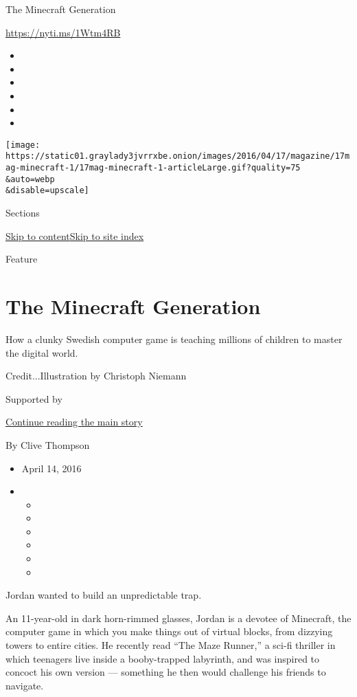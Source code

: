 The Minecraft Generation

\url{https://nyti.ms/1Wtm4RB}

\begin{itemize}
\item
\item
\item
\item
\item
\item
\end{itemize}

\texttt{[image: https://static01.graylady3jvrrxbe.onion/images/2016/04/17/magazine/17mag-minecraft-1/17mag-minecraft-1-articleLarge.gif?quality=75\\\&auto=webp\\\&disable=upscale]}

Sections

\protect\hyperlink{site-content}{Skip to
content}\protect\hyperlink{site-index}{Skip to site index}

Feature

\hypertarget{the-minecraft-generation}{%
\section{The Minecraft Generation}\label{the-minecraft-generation}}

How a clunky Swedish computer game is teaching millions of children to
master the digital world.

Credit...Illustration by Christoph Niemann

Supported by

\protect\hyperlink{after-sponsor}{Continue reading the main story}

By Clive Thompson

\begin{itemize}
\item
  April 14, 2016
\item
  \begin{itemize}
  \item
  \item
  \item
  \item
  \item
  \item
  \end{itemize}
\end{itemize}

Jordan wanted to build an unpredictable trap.

An 11-year-old in dark horn-­rimmed glasses, Jordan is a devotee of
Minecraft, the computer game in which you make things out of virtual
blocks, from dizzying towers to entire cities. He recently read ``The
Maze Runner,'' a sci-fi thriller in which teenagers live inside a
booby-­trapped labyrinth, and was inspired to concoct his own version
--- something he then would challenge his friends to navigate.

